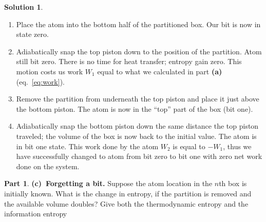 \documentclass[11pt]{article}
\theoremstyle{definition}
\newtheorem{question}{Part}[section]
\newtheorem*{solution}{Solution}
\numberwithin{equation}{section}
\numberwithin{figure}{section}
\begin{document}
\begin{solution}
~
\\
\begin{enumerate}
\item Place the atom into the bottom half of the partitioned box. Our bit is now in state zero.

\item Adiabatically snap the top piston down to the position of the partition. Atom still bit zero. There is no time for heat transfer; entropy gain zero. This motion costs us work $W_1$ equal to what we calculated in part \textbf{(a)} (eq.~\ref{eq:work}).

\item Remove the partition from underneath the top piston and place it just above the bottom piston. The atom is now in the ``top'' part of the box (bit one).

\item Adiabatically snap the bottom piston down the same distance the top piston traveled; the volume of the box is now back to the initial value. The atom is in bit one state. This work done by the atom $W_2$ is equal to $-W_1$, thus we have successfully changed to atom from bit zero to bit one with zero net work done on the system.
\end{enumerate}
\end{solution}

\begin{question}
\textbf{(c)~Forgetting a bit.} Suppose the atom location in the $n$th box is initially known. What is the change in entropy, if the partition is removed and the available volume doubles? Give both the thermodynamic entropy and the information entropy
\end{question}
\end{document}
